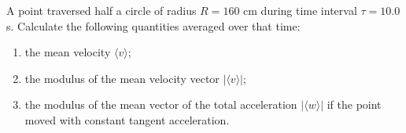 
\item A point traversed half a circle of radius \( R = 160 \) cm during time interval \( \tau = 10.0 \) s. Calculate the following quantities averaged over that time:
    \begin{enumerate}
        \item the mean velocity \( \langle v \rangle \);
        \item the modulus of the mean velocity vector \( |\langle v \rangle| \);
        \item the modulus of the mean vector of the total acceleration \( |\langle w \rangle| \) if the point moved with constant tangent acceleration.
    \end{enumerate}
